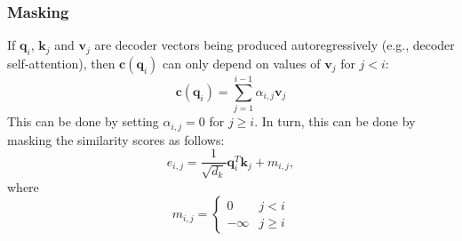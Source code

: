 \documentclass{beamer}
\begin{document}
\begin{frame}
  \frametitle{Masking}

  If $\bm{q}_i$, $\bm{k}_j$ and $\bm{v}_j$ are decoder vectors being
  produced autoregressively (e.g., decoder self-attention), then
  $\bm{c}(\bm{q}_i)$ can only depend on values of $\bm{v}_j$ for
  $j<i$:
  \begin{displaymath}
    \bm{c}(\bm{q}_i) = \sum_{j=1}^{i-1} \alpha_{i,j} \bm{v}_j
  \end{displaymath}
  This can be done by setting $\alpha_{i,j}=0$ for $j\ge i$.  In turn,
  this can be done by masking the similarity scores as follows:
  \begin{displaymath}
    e_{i,j} = \frac{1}{\sqrt{d_k}} \bm{q}_i^T\bm{k}_j + m_{i,j},
  \end{displaymath}
  where
  \begin{displaymath}
    m_{i,j} = \left\{\begin{array}{ll}
    0 & j < i\\
    -\infty & j\ge i
    \end{array}\right.
  \end{displaymath}
\end{frame}
\end{document}
